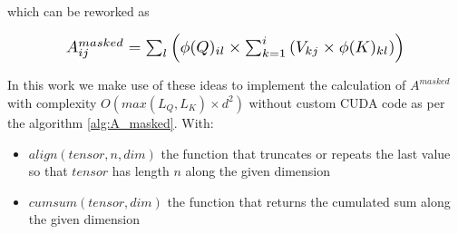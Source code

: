 \noindent{}which can be reworked as

\begin{equation}
	\resizebox{0.8\hsize}{!}{
		$A^{masked}_{ij}= \sum_l \left( \phi(Q)_{il} \times \sum_{k=1}^i \left(V_{kj} \times \phi(K)_{kl} \right) \right)$
	}
\end{equation}

In this work we make use of these ideas to implement the calculation of
 $A^{masked}$ with complexity $O(max(L_Q, L_K) \times d^2)$ without
 custom CUDA code as per the algorithm \ref{alg:A_masked}. With:
 \begin{itemize}
 	\item $align(tensor, n, dim)$ the function that truncates or repeats the last value so that $tensor$ has length $n$ along the given dimension
 	\item $cumsum(tensor, dim)$ the function that returns the cumulated sum along the given dimension
 \end{itemize}
